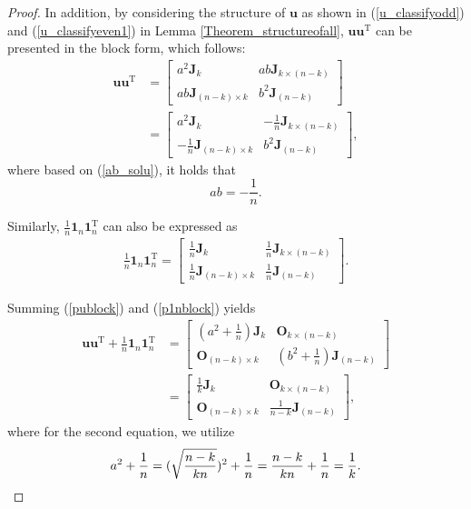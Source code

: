 \begin{proof}
In addition,   
by  considering  the  structure of   $\mathbf u$ as  shown in  (\ref{u_classifyodd})  and  (\ref{u_classifyeven1}) in Lemma \ref{Theorem_structureofall}, 
$ \mathbf u\mathbf u^{\mathrm T} $  can  be  presented in  the  block  form,  which  follows: 
\begin{align}\label{publock}
\mathbf u\mathbf u^{\mathrm T}
\nonumber
& =
\begin{bmatrix}
a^{2} \mathbf J_{k}   &   ab  \mathbf J_{k \times (n-k)}    \\
ab  \mathbf J_{(n-k) \times k}    &   b^{2} \mathbf J_{(n-k)}
\end{bmatrix}
\\ 
&= 
\begin{bmatrix}
a^{2} \mathbf J_{k} &   -\frac 1n  \mathbf J_{k \times (n-k)}    \\
-\frac 1n  \mathbf J_{(n-k) \times k}    &   	b^{2} \mathbf J_{(n-k)}
\end{bmatrix},	
\end{align}
where based on (\ref{ab_solu}), it holds that   
\begin{equation}\label{abmulti}
ab=   - \frac  1n 
. 
\end{equation} 

Similarly,   
$\frac  1n \mathbf 1_{n}\mathbf 1_{n}^{\mathrm T} $   can also be expressed as 
\begin{align}
\label{p1nblock}
\frac  1n \mathbf 1_{n}\mathbf 1_{n}^{\mathrm T} 
=
\begin{bmatrix}
\frac 1n \mathbf J_{k}  &   \frac 1n  \mathbf J_{k \times (n-k)}    \\
\frac 1n  \mathbf J_{(n-k) \times k}    &   	\frac 1n \mathbf J_{(n-k)}
\end{bmatrix}.   	
\end{align}

Summing (\ref{publock}) and (\ref{p1nblock})  yields
 \begin{align}
 \label{u1nblocksum}
 \mathbf u\mathbf u^{\mathrm T} + \frac  1n \mathbf 1_{n}\mathbf 1_{n}^{\mathrm T}
 \nonumber  
 &=
 \begin{bmatrix}
(a^{2} + \frac 1n) \mathbf J_{k}  &   \mathbf O_{k \times (n-k)}      \\
\mathbf O_{ (n-k) \times k }      &   	(b^{2} + \frac 1n)\mathbf J_{(n-k)}
 \end{bmatrix}
 \\ 
  &=
 \begin{bmatrix}
 \frac 1k \mathbf J_{k}  &   \mathbf O_{k \times (n-k)}      \\
 \mathbf O_{ (n-k) \times k }      &   	\frac{1}{n-k}\mathbf J_{(n-k)}
 \end{bmatrix},
 \end{align}
where  for the second  equation,   we   utilize  
\begin{align}
\notag
   a^{2} + \frac 1n =
(\sqrt{\frac{n-k}{k n}} )^{2} +  \frac 1n
=
\frac{n-k}{k n} + \frac 1n
=
\frac 1k.
\end{align}


\end{proof}
